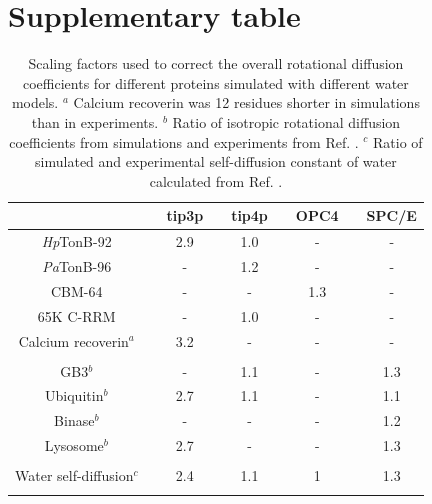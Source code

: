 \documentclass[journal=jpcbfk]{achemso}
\begin{document}
\newpage

\section{Supplementary table}

\begin{table}[!h]
  \centering
  \caption{Scaling factors used to correct the overall rotational diffusion coefficients for different proteins
    simulated with different water models.
    $^{a}$ Calcium recoverin was 12 residues shorter in simulations than in experiments.
    $^{b}$ Ratio of isotropic rotational diffusion coefficients from simulations and experiments from Ref. .
    $^{c}$ Ratio of simulated and experimental self-diffusion constant of water calculated from Ref. .  }\label{ROTdiffCOEFFSscaled}
  \begin{tabular}{c c c c c c c c c}
                                       &    & tip3p &  & tip4p && OPC4 && SPC/E \\
    \hline
    {\it Hp}TonB-92                    &    & 2.9   &  & 1.0     && -  && - \\
    {\it Pa}TonB-96                    &    &  -    &  & 1.2   && -    && -\\
    CBM-64 \cite{heikkinen18}          &    &  -    &  & -     && 1.3  && -\\
    65K C-RRM \cite{norppa18}          &    & -     &  & 1.0     && -  && -\\
    Calcium recoverin$^{a}$ \cite{timr18}    &    &  3.2  &  & -     && -    && -\\
    &&&&&& \\
    GB3$^{b}$                           &    & -     &  & 1.1    && -   && 1.3 \\
    Ubiquitin$^{b}$                     &    & 2.7   &  & 1.1    && -   && 1.1 \\
    Binase$^{b}$                        &    & -     &  & -   && -   && 1.2 \\
    Lysosome$^{b}$                      &    & 2.7   &  & -    && -   && 1.3 \\
    &&&&&& \\
    Water self-diffusion$^{c}$  &    & 2.4   & & 1.1   &&  1 && 1.3 \\
    &&&&&& \\
  \end{tabular}
  \newline
  \flushleft
\end{table}


\end{document}
